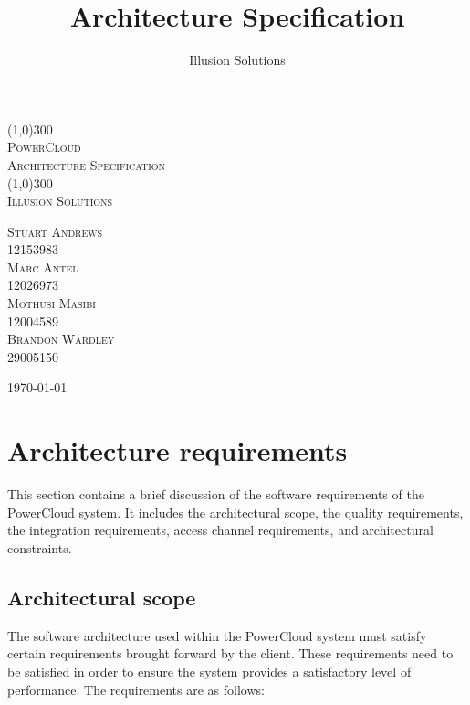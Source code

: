 \documentclass{article}
\title{
	Architecture Specification
}
\author{Illusion Solutions}
\begin{document}
	
	\begin{titlepage}
		\begin{center}
			\line(1,0){300} \\
			[0.1cm]
			\textsc{\Huge
				PowerCloud\\
				Architecture Specification
			} \\
			[0.1cm]
			\line(1,0){300} \\
			[2.0cm]
			\textsc{\Large
				Illusion Solutions
			} \\
			[3.5cm]
			
		\end{center}
		\begin{flushright}
			\textsc{\Large
				Stuart Andrews\\ 
				12153983\\
				Marc Antel\\
				12026973\\
				Mothusi Masibi\\
				12004589\\
				Brandon Wardley\\
				29005150\\
				[4.0cm]
			}
		\end{flushright}
		\begin{center}
			\today
		\end{center}
	\end{titlepage}

\newpage
\restoregeometry
\tableofcontents
\thispagestyle{empty}

\newpage

\section{Architecture requirements}

This section contains a brief discussion of the software requirements of 
the PowerCloud system. It includes the architectural scope, the quality 
requirements, the integration requirements, access channel requirements, 
and architectural constraints.

	\subsection{Architectural scope}
	
	The software architecture used within the PowerCloud system must 
	satisfy certain requirements brought forward by the client. These 
	requirements need to be satisfied in order to ensure the system 
	provides a satisfactory level of performance. The requirements are as 
	follows:
\end{document}
